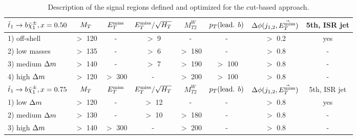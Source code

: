 \begin{table}[!ht]
{\begin{center}
\begin{tabular}{|l|ccccccc|}
    $\tilde{t}_1 \rightarrow b\tilde{\chi}_1^\pm, x=0.50$     & $M_T$     & $E_T^\text{miss}$    & $E_T^\text{miss}/\sqrt{H_T}$ & $M_{T2}^W$ & $p_T(\text{lead. }b)$ & $\Delta\phi(j_{1,2},\vec{E_T^\text{miss}})$ & 5th, ISR jet  \\
    \hline
    1) off-shell        &  $>$ 120  &   -      &  $>$  9         &    -       & -                     &  $>$ 0.2      & yes           \\
    2) low masses       &  $>$ 135  &   -      &  $>$  6         & $>$ 180    & -                     &  $>$ 0.8      & -             \\
    3) medium $\Delta m$ &  $>$ 140  &   -      &  $>$  7         & $>$ 190    & $>$ 100               &  $>$ 0.8      & -             \\
    4) high   $\Delta m$ &  $>$ 120  & $>$ 300  &   -             & $>$ 200    & $>$ 100               &  $>$ 0.8      & -             \\
    \hline
    $\tilde{t}_1 \rightarrow b\tilde{\chi}_1^\pm, x=0.75$   & $M_T$     & $E_T^\text{miss}$    & $E_T^\text{miss}/\sqrt{H_T}$ & $M_{T2}^W$ & $p_T(\text{lead. }b)$ & $\Delta\phi(j_{1,2},\vec{E_T^\text{miss}})$ & 5th, ISR jet  \\
    \hline
    1) low    $\Delta m$ &  $>$ 120  &   -      &  $>$  12        &     -      &      -                &  $>$ 0.8      & yes           \\
    2) medium $\Delta m$ &  $>$ 130  &   -      &  $>$  10        &  $>$ 180   &      -                &  $>$ 0.8      & -             \\
    3) high   $\Delta m$ &  $>$ 140  & $>$ 300  &    -            &  $>$ 200   &      -                &  $>$ 0.8      & -             \\
    \hline                                                 
    \end{tabular}
\caption{Description of the signal regions defined and optimized for the cut-based approach. \label{tab:cutAndCountCuts}} 
\end{center}}
\end{table}


